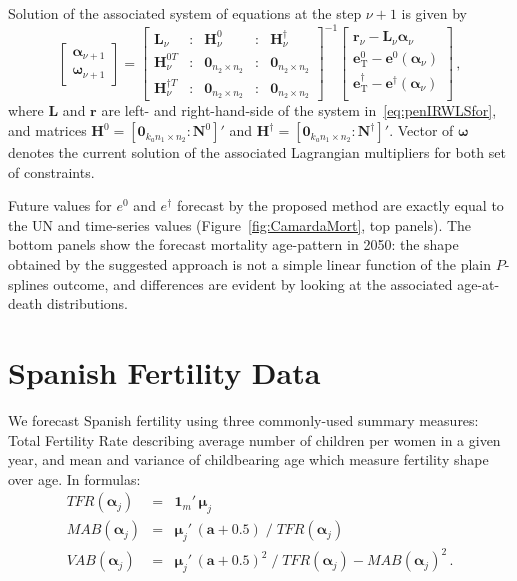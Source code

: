 \documentclass[12pt,a4paper,twoside]{article}
\begin{document}
Solution of the associated system of equations at the step $\nu + 1$ is given by
\begin{equation}\label{eq:SQLalg}
\left[ \begin{array}{l}
\bm{\alpha}_{\nu+1}\\
\bm{\omega}_{\nu+1}
\end{array}\right] = 
\left[ \begin{array}{lllll}
\bm{L}_{\nu}  &:& \bm{H}^{0}_{\nu} &:& \bm{H}^{\dagger}_{\nu}\\
\bm{H}_{\nu}^{0 T}  &:& \bm{0}_{n_{2} \times n_{2}}&:&\bm{0}_{n_{2} \times n_{2}}\\
\bm{H}_{\nu}^{\dagger T} &:& \bm{0}_{n_{2} \times n_{2}} &:& \bm{0}_{n_{2} \times n_{2}}
\end{array}\right]^{-1}
\left[ \begin{array}{c}
\bm{r}_{\nu} - \bm{L}_{\nu}\bm{\alpha}_{\nu}\\
\bm{e}^{0}_{\mathrm{T}} - \bm{e}^{0} (\bm{\alpha}_{\nu})\\
\bm{e}^{\dagger}_{\mathrm{T}} - \bm{e}^{\dagger} (\bm{\alpha}_{\nu})\\
\end{array}\right] \, ,
\end{equation}
where $\bm{L}$ and $\bm{r}$ are left- and right-hand-side of the system in~\eqref{eq:penIRWLSfor}, and matrices $\bm{H}^{0} = \left[\bm{0}_{k_{a}n_{1}\times n_{2}}:\bm{N}^{0} \right]'$ and $\bm{H}^{\dagger} = \left[\bm{0}_{k_{a}n_{1}\times n_{2}}:\bm{N}^{\dagger} \right]'$. Vector of $\bm{\omega}$ denotes the current solution of the associated Lagrangian multipliers for both set of constraints.

Future values for $e^{0}$ and $e^{\dagger}$ forecast by the proposed method are exactly equal to the UN and time-series values (Figure~\ref{fig:CamardaMort}, top panels). The bottom panels show the forecast mortality age-pattern in 2050: the shape obtained by the suggested approach is not a simple linear function of the plain $P$-splines outcome, and differences are evident by looking at the associated age-at-death distributions. 

\section{Spanish Fertility Data}

We forecast Spanish fertility using three commonly-used summary measures: Total Fertility Rate describing average number of children per women in a given year, and mean and variance of childbearing age which measure fertility shape over age. In formulas:
\begin{eqnarray}\label{eq:FertMea}
TFR(\bm{\alpha}_{j}) &=& \bm{1}_{m}' \, \bm{\mu}_{j}\\
MAB(\bm{\alpha}_{j}) &=& \bm{\mu}_{j}' \, (\bm{a}+0.5) \; / \; TFR(\bm{\alpha}_{j})\nonumber\\
VAB(\bm{\alpha}_{j}) &=& \bm{\mu}_{j}' \, (\bm{a}+0.5)^2 \; / \; TFR(\bm{\alpha}_{j}) - MAB(\bm{\alpha}_{j})^2\nonumber \, .
\end{eqnarray} 
\end{document}
